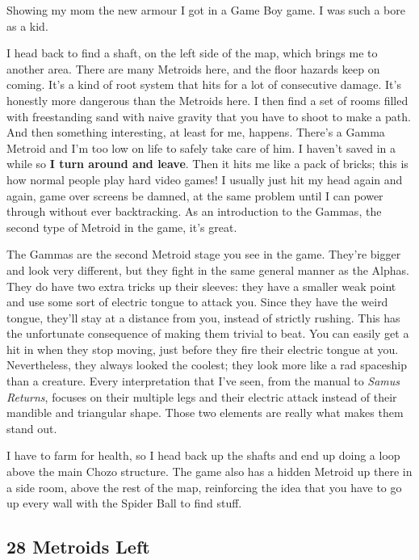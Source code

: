 \documentclass{book}
\begin{document}
Showing my mom the new armour I got in a Game Boy game. I was such a bore as a kid.\par
I head back to find a shaft, on the left side of the map, which brings me to another area. There are many Metroids here, and the floor hazards keep on coming. It’s a kind of root system that hits for a lot of consecutive damage. It’s honestly more dangerous than the Metroids here. I then find a set of rooms filled with freestanding sand with naive gravity that you have to shoot to make a path. And then something interesting, at least for me, happens. There’s a Gamma Metroid and I’m too low on life to safely take care of him. I haven’t saved in a while so \textbf{I turn around and leave}. Then it hits me like a pack of bricks; this is how normal people play hard video games! I usually just hit my head again and again, game over screens be damned, at the same problem until I can power through without ever backtracking. As an introduction to the Gammas, the second type of Metroid in the game, it’s great.\par
The Gammas are the second Metroid stage you see in the game. They’re bigger and look very different, but they fight in the same general manner as the Alphas. They do have two extra tricks up their sleeves: they have a smaller weak point and use some sort of electric tongue to attack you. Since they have the weird tongue, they’ll stay at a distance from you, instead of strictly rushing. This has the unfortunate consequence of making them trivial to beat. You can easily get a hit in when they stop moving, just before they fire their electric tongue at you. Nevertheless, they always looked the coolest; they look more like a rad spaceship than a creature. Every interpretation that I’ve seen, from the manual to \emph{Samus Returns}, focuses on their multiple legs and their electric attack instead of their mandible and triangular shape. Those two elements are really what makes them stand out.\par
I have to farm for health, so I head back up the shafts and end up doing a loop above the main Chozo structure. The game also has a hidden Metroid up there in a side room, above the rest of the map, reinforcing the idea that you have to go up every wall with the Spider Ball to find stuff.\par
\FloatBarrier\subsection*{28 Metroids Left}
\end{document}
